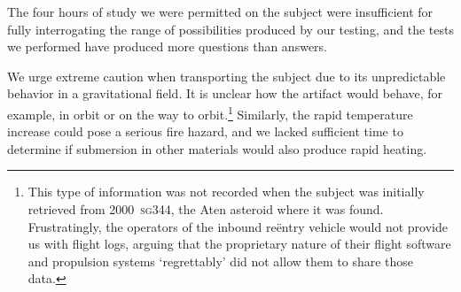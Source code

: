 \documentclass[10pt]{article}
\begin{document}
The four hours of study we were permitted on the subject were insufficient for fully interrogating the range of possibilities produced by our testing, and the tests we performed have produced more questions than answers.

We urge extreme caution when transporting the subject due to its unpredictable behavior in a gravitational field.
It is unclear how the artifact would behave, for example, in orbit or on the way to orbit.\footnote{This type of information was not recorded when the subject was initially retrieved from 2000~\textsc{sg}344, the Aten asteroid where it was found. Frustratingly, the operators of the inbound re\"entry vehicle would not provide us with flight logs, arguing that the proprietary nature of their flight software and propulsion systems `regrettably' did not allow them to share those data.} Similarly, the rapid temperature increase could pose a serious fire hazard, and we lacked sufficient time to determine if submersion in other materials would also produce rapid heating.

%
%
\end{document}
